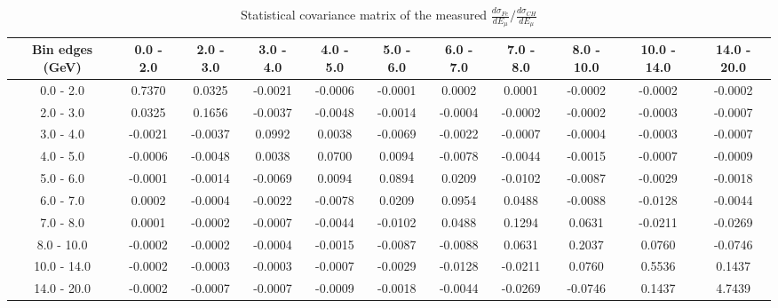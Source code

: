 \documentclass[aps,prl,twocolumn,superscriptaddress,nofootinbib]{revtex4-1}
\begin{document}
\begin{turnpage}
 \begin{table}[h!]
  \centering
  \caption{Statistical covariance matrix of the measured $\frac{d\sigma_{Fe}}{dE_{\mu}}/\frac{d\sigma_{CH}}{dE_{\mu}}$}
    \begin{tabular}{c||cccccccccc}
      Bin edges (GeV) & 0.0 - 2.0 & 2.0 - 3.0 & 3.0 - 4.0 & 4.0 - 5.0 & 5.0 - 6.0 & 6.0 - 7.0 & 7.0 - 8.0 & 8.0 - 10.0 & 10.0 - 14.0 & 14.0 - 20.0 \\
\hline \hline
        0.0 - 2.0 &  0.7370 &  0.0325 & -0.0021 & -0.0006 & -0.0001 &  0.0002 &  0.0001 & -0.0002 & -0.0002 & -0.0002 \\
        2.0 - 3.0 &  0.0325 &  0.1656 & -0.0037 & -0.0048 & -0.0014 & -0.0004 & -0.0002 & -0.0002 & -0.0003 & -0.0007 \\
        3.0 - 4.0 & -0.0021 & -0.0037 &  0.0992 &  0.0038 & -0.0069 & -0.0022 & -0.0007 & -0.0004 & -0.0003 & -0.0007 \\
        4.0 - 5.0 & -0.0006 & -0.0048 &  0.0038 &  0.0700 &  0.0094 & -0.0078 & -0.0044 & -0.0015 & -0.0007 & -0.0009 \\
        5.0 - 6.0 & -0.0001 & -0.0014 & -0.0069 &  0.0094 &  0.0894 &  0.0209 & -0.0102 & -0.0087 & -0.0029 & -0.0018 \\
        6.0 - 7.0 &  0.0002 & -0.0004 & -0.0022 & -0.0078 &  0.0209 &  0.0954 &  0.0488 & -0.0088 & -0.0128 & -0.0044 \\
        7.0 - 8.0 &  0.0001 & -0.0002 & -0.0007 & -0.0044 & -0.0102 &  0.0488 &  0.1294 &  0.0631 & -0.0211 & -0.0269 \\
       8.0 - 10.0 & -0.0002 & -0.0002 & -0.0004 & -0.0015 & -0.0087 & -0.0088 &  0.0631 &  0.2037 &  0.0760 & -0.0746 \\
      10.0 - 14.0 & -0.0002 & -0.0003 & -0.0003 & -0.0007 & -0.0029 & -0.0128 & -0.0211 &  0.0760 &  0.5536 &  0.1437 \\
      14.0 - 20.0 & -0.0002 & -0.0007 & -0.0007 & -0.0009 & -0.0018 & -0.0044 & -0.0269 & -0.0746 &  0.1437 &  4.7439 \\
    \end{tabular}
  \label{tablecov:Fe_Statistical_Emu}
  \end{table}
\end{turnpage}
\end{document}
